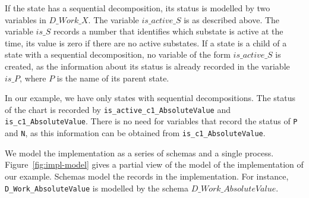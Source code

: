 \documentclass[submission]{eptcs}
\begin{document}
If the state has a sequential decomposition, its status is modelled by two variables in $D\_Work\_X$. The variable $is\_active\_S$ is as described above. The variable $is\_S$ records a number that identifies which substate is active at the time, its value is zero if there are no active substates. If a state is a child of a state with a sequential decomposition, no variable of the form $is\_active\_S$ is created, as the information about its status is already recorded in the variable $is\_P$, where $P$ is the name of its parent state.

In our example, we have only states with sequential decompositions. The status of the chart is recorded by \texttt{is\_active\_c1\_AbsoluteValue} and \texttt{is\_c1\_AbsoluteValue}. There is no need for variables that record the status of \texttt{P} and \texttt{N}, as this information can be obtained from \texttt{is\_c1\_AbsoluteValue}.








We model the implementation as a series of schemas and a single process. Figure~\ref{fig:impl-model} gives a partial view of the model of the implementation of our example. Schemas model the records in the implementation. For instance, \texttt{D\_Work\_AbsoluteValue} is modelled by the schema $D\_Work\_AbsoluteValue$.
\end{document}
